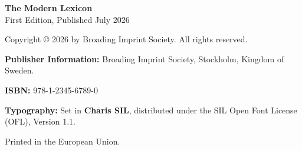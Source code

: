 \thispagestyle{empty}
\vspace*{\fill}
\begin{flushleft}
\footnotesize
\textbf{The Modern Lexicon} \\
First Edition, Published July 2026\par\vspace{1em}
Copyright © 2026 by Broading Imprint Society. All rights reserved.\par\vspace{1em}
\textbf{Publisher Information:} Broading Imprint Society, Stockholm, Kingdom of Sweden.\par\vspace{1em}
\textbf{ISBN:} 978-1-2345-6789-0\par\vspace{1em}
\textbf{Typography:} Set in \textbf{Charis SIL}, distributed under the SIL Open Font License (OFL), Version 1.1.\par\vspace{1em}
Printed in the European Union.
\end{flushleft}

